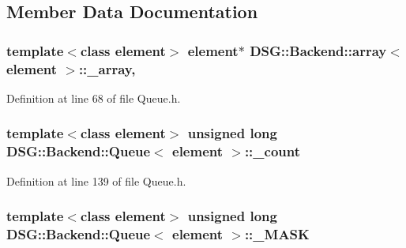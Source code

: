 \subsection{Member Data Documentation}
\hypertarget{classDSG_1_1Backend_1_1array_a520f838f921d4f48852694e79da0564c}{
\subsubsection[{\+\_\+array}]{\setlength{\rightskip}{0pt plus 5cm}template$<$class element$>$ element$\ast$ {\bf D\+S\+G\+::\+Backend\+::array}$<$ element $>$\+::\+\_\+array\hspace{0.3cm}{\ttfamily [protected]}, {\ttfamily [inherited]}}}\label{classDSG_1_1Backend_1_1array_a520f838f921d4f48852694e79da0564c}


Definition at line 68 of file Queue.\+h.

\hypertarget{classDSG_1_1Backend_1_1Queue_ae2ec3926f9e8cbabd17dadb309bcc26f}{
\subsubsection[{\+\_\+count}]{\setlength{\rightskip}{0pt plus 5cm}template$<$class element$>$ unsigned long {\bf D\+S\+G\+::\+Backend\+::\+Queue}$<$ element $>$\+::\+\_\+count\hspace{0.3cm}{\ttfamily [protected]}}}\label{classDSG_1_1Backend_1_1Queue_ae2ec3926f9e8cbabd17dadb309bcc26f}


Definition at line 139 of file Queue.\+h.

\hypertarget{classDSG_1_1Backend_1_1Queue_ad82aa028cc33db5cc22a4c478dabe399}{
\subsubsection[{\+\_\+\+M\+A\+S\+K}]{\setlength{\rightskip}{0pt plus 5cm}template$<$class element$>$ unsigned long {\bf D\+S\+G\+::\+Backend\+::\+Queue}$<$ element $>$\+::\+\_\+\+M\+A\+S\+K\hspace{0.3cm}{\ttfamily [protected]}}}\label{classDSG_1_1Backend_1_1Queue_ad82aa028cc33db5cc22a4c478dabe399}


